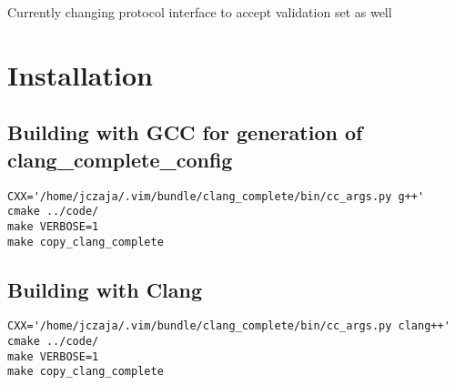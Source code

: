\documentclass[a4paper,10pt]{article}
\begin{document}
Currently changing protocol interface to accept validation set as well


\section{Installation}
\subsection{Building with GCC for generation of clang\_complete\_config}
\begin{verbatim}
CXX='/home/jczaja/.vim/bundle/clang_complete/bin/cc_args.py g++'   cmake ../code/
make VERBOSE=1
make copy_clang_complete
\end{verbatim}
\subsection{Building with Clang}
\begin{verbatim}
CXX='/home/jczaja/.vim/bundle/clang_complete/bin/cc_args.py clang++'   cmake ../code/
make VERBOSE=1
make copy_clang_complete
\end{verbatim}
\end{document}
